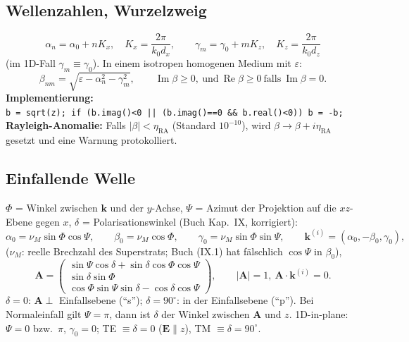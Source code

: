 \subsection{Wellenzahlen, Wurzelzweig}
\begin{equation}
  \alpha_n=\alpha_0+nK_x,\quad K_x=\frac{2\pi}{k_0d_x},\qquad
  \gamma_m=\gamma_0+mK_z,\quad K_z=\frac{2\pi}{k_0d_z}
  \label{eq:alpha_gamma}
\end{equation}
(im 1D-Fall $\gamma_m\equiv\gamma_0$). In einem isotropen homogenen Medium mit $\varepsilon$:
\begin{equation}
  \beta_{nm}=\sqrt{\varepsilon-\alpha_n^2-\gamma_m^2},\qquad
  \operatorname{Im}\beta\ge0,\ \text{und}\ \operatorname{Re}\beta\ge0\ \text{falls}\ \operatorname{Im}\beta=0 .
  \label{eq:beta_branch}
\end{equation}
\textbf{Implementierung:}\\ \verb!b = sqrt(z); if (b.imag()<0 || (b.imag()==0 && b.real()<0)) b = -b;!
\textbf{Rayleigh-Anomalie:} Falls $|\beta|<\eta_{\text{RA}}$ (Standard $10^{-10}$), wird
$\beta\to\beta+i\eta_{\text{RA}}$ gesetzt und eine Warnung protokolliert.

\subsection{Einfallende Welle}
$\Phi$ = Winkel zwischen $\mathbf k$ und der $y$-Achse, $\Psi$ = Azimut der Projektion auf die
$xz$-Ebene gegen $x$, $\delta$ = Polarisationswinkel (Buch Kap.~IX, korrigiert):
\begin{equation}
  \alpha_0=\nu_M\sin\Phi\cos\Psi,\qquad \beta_0=\nu_M\cos\Phi,\qquad \gamma_0=\nu_M\sin\Phi\sin\Psi,
  \qquad \mathbf k^{(i)}=(\alpha_0,-\beta_0,\gamma_0),
  \label{eq:incidence}
\end{equation}
($\nu_M$: reelle Brechzahl des Superstrats; Buch (IX.1) hat fälschlich $\cos\Psi$ in $\beta_0$),
\begin{equation}
  \mathbf A=\begin{pmatrix}\sin\Psi\cos\delta+\sin\delta\cos\Phi\cos\Psi\\ \sin\delta\sin\Phi\\
  \cos\Phi\sin\Psi\sin\delta-\cos\delta\cos\Psi\end{pmatrix},\qquad |\mathbf A|=1,\ \mathbf A\cdot\mathbf k^{(i)}=0 .
  \label{eq:polarization}
\end{equation}
$\delta=0$: $\mathbf A\perp$ Einfallsebene (\enquote{s}); $\delta=90^\circ$: in der Einfallsebene (\enquote{p}).
Bei Normaleinfall gilt $\Psi=\pi$, dann ist $\delta$ der Winkel zwischen $\mathbf A$ und $z$.
1D-in-plane: $\Psi=0$ bzw.\ $\pi$, $\gamma_0=0$; TE $\equiv\delta=0$ ($\mathbf E\parallel z$), TM $\equiv\delta=90^\circ$.


